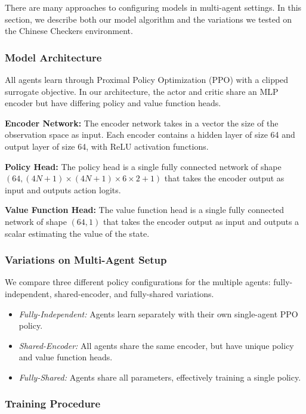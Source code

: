 \documentclass[12pt, a4paper, twocolumn]{article}
\begin{document}
There are many approaches to configuring models in multi-agent settings. In this section, we describe both our model algorithm and the variations we tested on the Chinese Checkers environment.

\subsubsection{Model Architecture}

All agents learn through Proximal Policy Optimization (PPO) with a clipped surrogate objective\cite{PPO}. In our architecture, the actor and critic share an MLP encoder but have differing policy and value function heads.

\textbf{Encoder Network:} The encoder network takes in a vector the size of the observation space as input. Each encoder contains a hidden layer of size 64 and output layer of size 64, with ReLU activation functions.

\textbf{Policy Head:} The policy head is a single fully connected network of shape $(64, (4N + 1) \times (4N + 1) \times 6 \times 2 + 1)$ that takes the encoder output as input and outputs action logits.

\textbf{Value Function Head:} The value function head is a single fully connected network of shape $(64, 1)$ that takes the encoder output as input and outputs a scalar estimating the value of the state.

\subsubsection{Variations on Multi-Agent Setup}

We compare three different policy configurations for the multiple agents: fully-independent, shared-encoder, and fully-shared variations.
\begin{itemize}
  \item \textit{Fully-Independent:} Agents learn separately with their own single-agent PPO policy. 
  \item \textit{Shared-Encoder:} All agents share the same encoder, but have unique policy and value function heads.
  \item \textit{Fully-Shared:} Agents share all parameters, effectively training a single policy.
\end{itemize}

\subsubsection{Training Procedure}
\end{document}
